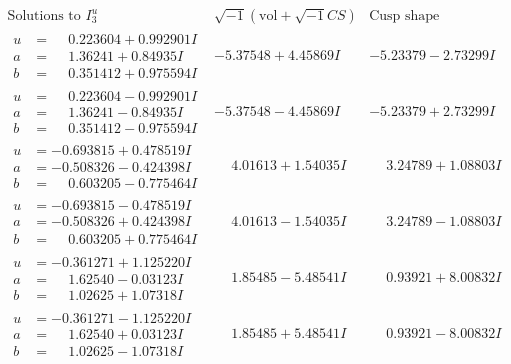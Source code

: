 \documentclass[1p]{elsarticle_modified}
\theoremstyle{definition}
\newcommand{\I}{\sqrt{-1}}
\begin{document}
$$\begin{array}{c|c|c}  
\text{Solutions to }I^u_{3}& \I (\text{vol} + \sqrt{-1}CS) & \text{Cusp shape}\\
 \hline 
\begin{aligned}
u &= \phantom{-}0.223604 + 0.992901 I \\
a &= \phantom{-}1.36241 + 0.84935 I \\
b &= \phantom{-}0.351412 + 0.975594 I\end{aligned}
 & -5.37548 + 4.45869 I & -5.23379 - 2.73299 I \\ \hline\begin{aligned}
u &= \phantom{-}0.223604 - 0.992901 I \\
a &= \phantom{-}1.36241 - 0.84935 I \\
b &= \phantom{-}0.351412 - 0.975594 I\end{aligned}
 & -5.37548 - 4.45869 I & -5.23379 + 2.73299 I \\ \hline\begin{aligned}
u &= -0.693815 + 0.478519 I \\
a &= -0.508326 - 0.424398 I \\
b &= \phantom{-}0.603205 - 0.775464 I\end{aligned}
 & \phantom{-}4.01613 + 1.54035 I & \phantom{-}3.24789 + 1.08803 I \\ \hline\begin{aligned}
u &= -0.693815 - 0.478519 I \\
a &= -0.508326 + 0.424398 I \\
b &= \phantom{-}0.603205 + 0.775464 I\end{aligned}
 & \phantom{-}4.01613 - 1.54035 I & \phantom{-}3.24789 - 1.08803 I \\ \hline\begin{aligned}
u &= -0.361271 + 1.125220 I \\
a &= \phantom{-}1.62540 - 0.03123 I \\
b &= \phantom{-}1.02625 + 1.07318 I\end{aligned}
 & \phantom{-}1.85485 - 5.48541 I & \phantom{-}0.93921 + 8.00832 I \\ \hline\begin{aligned}
u &= -0.361271 - 1.125220 I \\
a &= \phantom{-}1.62540 + 0.03123 I \\
b &= \phantom{-}1.02625 - 1.07318 I\end{aligned}
 & \phantom{-}1.85485 + 5.48541 I & \phantom{-}0.93921 - 8.00832 I \\ \hline\begin{aligned}

\end{aligned}
\end{array}$$
\end{document}
